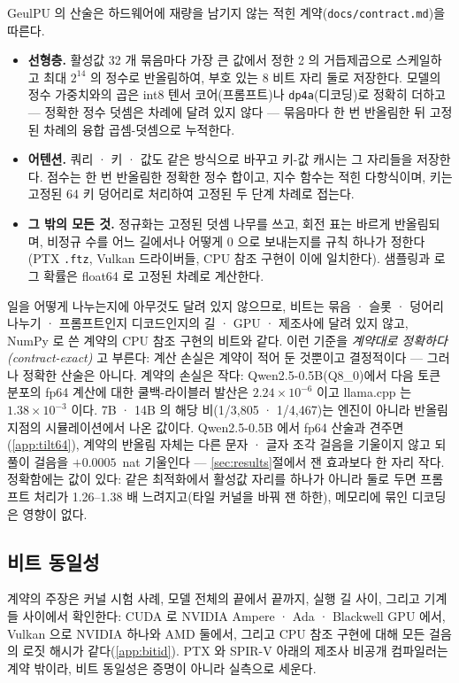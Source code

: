 \documentclass[11pt]{article}
\begin{document}
GeulPU 의 산술은 하드웨어에 재량을 남기지 않는 적힌 계약(\texttt{docs/contract.md})을 따른다.
\begin{itemize}
\item \textbf{선형층.} 활성값 32 개 묶음마다 가장 큰 값에서 정한 2 의 거듭제곱으로 스케일하고 최대 $2^{14}$ 의 정수로
      반올림하여, 부호 있는 8 비트 자리 둘로 저장한다. 모델의 정수 가중치와의 곱은 int8 텐서 코어(프롬프트)나
      \texttt{dp4a}(디코딩)로 정확히 더하고 --- 정확한 정수 덧셈은 차례에 달려 있지 않다 --- 묶음마다 한 번 반올림한 뒤
      고정된 차례의 융합 곱셈-덧셈으로 누적한다.
\item \textbf{어텐션.} 쿼리 · 키 · 값도 같은 방식으로 바꾸고 키-값 캐시는 그 자리들을 저장한다. 점수는 한 번 반올림한 정확한
      정수 합이고, 지수 함수는 적힌 다항식이며, 키는 고정된 64 키 덩어리로 처리하여 고정된 두 단계 차례로 접는다.
\item \textbf{그 밖의 모든 것.} 정규화는 고정된 덧셈 나무를 쓰고, 회전 표는 바르게 반올림되며, 비정규 수를 어느 길에서나 어떻게
      0 으로 보내는지를 규칙 하나가 정한다(PTX \texttt{.ftz}, Vulkan 드라이버들, CPU 참조 구현이 이에 일치한다). 샘플링과 로그
      확률은 float64 로 고정된 차례로 계산한다.
\end{itemize}

일을 어떻게 나누는지에 아무것도 달려 있지 않으므로, 비트는 묶음 · 슬롯 · 덩어리 나누기 · 프롬프트인지 디코드인지의 길 · GPU ·
제조사에 달려 있지 않고, NumPy 로 쓴 계약의 CPU 참조 구현의 비트와 같다. 이런 기준을 \emph{계약대로 정확하다(contract-exact)}
고 부른다: 계산 손실은 계약이 적어 둔 것뿐이고 결정적이다 --- 그러나 정확한 산술은 아니다. 계약의 손실은 작다:
Qwen2.5-0.5B(Q8\_0)에서 다음 토큰 분포의 fp64 계산에 대한 쿨백-라이블러 발산은 $2.24\times10^{-6}$ 이고 llama.cpp 는
$1.38\times10^{-3}$ 이다. 7B · 14B 의 해당 비(1/3,805 · 1/4,467)는 엔진이 아니라 반올림 지점의 시뮬레이션에서 나온 값이다.
Qwen2.5-0.5B 에서 fp64 산술과 견주면(\ref{app:tilt64}), 계약의 반올림 자체는 다른 문자 · 글자 조각 걸음을 기울이지 않고 되풀이
걸음을 $+0.0005$~nat 기울인다 --- \ref{sec:results}절에서 잰 효과보다 한 자리 작다.
정확함에는 값이 있다: 같은 최적화에서 활성값 자리를 하나가 아니라 둘로 두면 프롬프트 처리가 1.26--1.38 배 느려지고(타일 커널을
바꿔 잰 하한), 메모리에 묶인 디코딩은 영향이 없다.

\subsection{비트 동일성}\label{sec:bitid}

계약의 주장은 커널 시험 사례, 모델 전체의 끝에서 끝까지, 실행 길 사이, 그리고 기계들 사이에서 확인한다: CUDA 로 NVIDIA Ampere ·
Ada · Blackwell GPU 에서, Vulkan 으로 NVIDIA 하나와 AMD 둘에서, 그리고 CPU 참조 구현에 대해 모든 걸음의 로짓 해시가
같다(\ref{app:bitid}). PTX 와 SPIR-V 아래의 제조사 비공개 컴파일러는 계약 밖이라, 비트 동일성은 증명이 아니라 실측으로 세운다.
\end{document}
